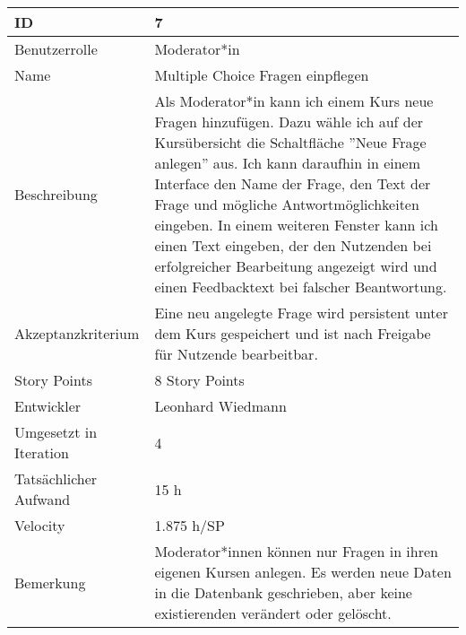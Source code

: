 \begin{tabularx}{\textwidth}{|p{}|X|}
	\hline
	ID & 7\\
	\hline
	Benutzerrolle & Moderator*in\\
	\hline
	Name & Multiple Choice Fragen einpflegen\\
	\hline
	Beschreibung & Als Moderator*in kann ich einem Kurs neue Fragen hinzufügen. Dazu wähle ich auf der Kursübersicht die Schaltfläche ''Neue Frage anlegen'' aus. Ich kann daraufhin in einem Interface den Name der Frage, den Text der Frage und mögliche Antwortmöglichkeiten eingeben. In einem weiteren Fenster kann ich einen Text eingeben, der den Nutzenden bei erfolgreicher Bearbeitung angezeigt wird und einen Feedbacktext bei falscher Beantwortung.\\
	\hline
	Akzeptanzkriterium & Eine neu angelegte Frage wird persistent unter dem Kurs gespeichert und ist nach Freigabe für Nutzende bearbeitbar.\\
	\hline
	Story Points & 8 Story Points\\
	\hline
	Entwickler & Leonhard Wiedmann\\
	\hline
	Umgesetzt in Iteration & 4\\
	\hline
	Tatsächlicher Aufwand & 15 h\\
	\hline
	Velocity & 1.875 h/SP\\
	\hline
	Bemerkung & Moderator*innen können nur Fragen in ihren eigenen Kursen anlegen. Es werden neue Daten in die Datenbank geschrieben, aber keine existierenden verändert oder gelöscht.\\
	\hline
\end{tabularx}
\vspace{20pt}

